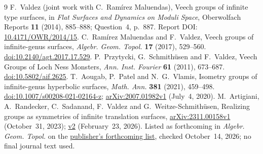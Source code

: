 \documentclass[11pt]{article}
\begin{document}
\begin{thebibliography}{9}\small
{} F.~Valdez (joint work with C.~Ram\'irez Maluendas), Veech groups of infinite type surfaces, in \emph{Flat Surfaces and Dynamics on Moduli Space}, Oberwolfach Reports \textbf{11} (2014), 885--888; Question~4, p.~887. Report DOI: \href{https://doi.org/10.4171/OWR/2014/15}{10.4171/OWR/2014/15}.
 C.~Ram\'irez Maluendas and F.~Valdez, Veech groups of infinite-genus surfaces, \emph{Algebr. Geom. Topol.} \textbf{17} (2017), 529--560. \href{https://doi.org/10.2140/agt.2017.17.529}{doi:10.2140/agt.2017.17.529}.
 P.~Przytycki, G.~Schmith\"usen and F.~Valdez, Veech Groups of Loch Ness Monsters, \emph{Ann. Inst. Fourier} \textbf{61} (2011), 673--687. \href{https://doi.org/10.5802/aif.2625}{doi:10.5802/aif.2625}.
 T.~Aougab, P.~Patel and N.~G.~Vlamis, Isometry groups of infinite-genus hyperbolic surfaces, \emph{Math. Ann.} \textbf{381} (2021), 459--498. \href{https://doi.org/10.1007/s00208-021-02164-z}{doi:10.1007/s00208-021-02164-z}; \href{https://arxiv.org/abs/2007.01982v1}{arXiv:2007.01982v1} (July~4, 2020).
 M.~Artigiani, A.~Randecker, C.~Sadanand, F.~Valdez and G.~Weitze-Schmith\"usen, Realizing groups as symmetries of infinite translation surfaces, \href{https://arxiv.org/abs/2311.00158v1}{arXiv:2311.00158v1} (October~31, 2023); \href{https://arxiv.org/abs/2311.00158v2}{v2} (February~23, 2026). Listed as forthcoming in \emph{Algebr. Geom. Topol.} on the \href{https://msp.org/soon/coming.php?jpath=agt}{publisher's forthcoming list}, checked October~14, 2026; no final journal text used.
\end{thebibliography}
\end{document}
